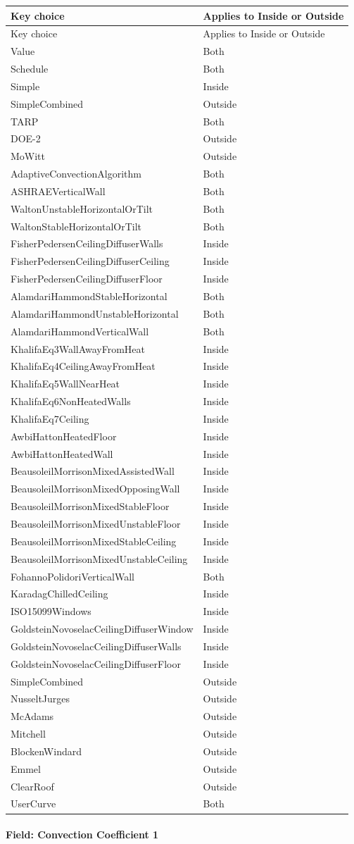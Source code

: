 \begin{longtable}[c]{p{3.49in}p{2.5in}}
\toprule
Key choice & Applies to Inside or Outside \tabularnewline
\midrule
\endfirsthead

\toprule
Key choice & Applies to Inside or Outside \tabularnewline
\midrule
\endhead

Value & Both \tabularnewline
Schedule & Both \tabularnewline
Simple & Inside \tabularnewline
SimpleCombined & Outside \tabularnewline
TARP & Both \tabularnewline
DOE-2 & Outside \tabularnewline
MoWitt & Outside \tabularnewline
AdaptiveConvectionAlgorithm & Both \tabularnewline
ASHRAEVerticalWall~~~ & Both \tabularnewline
WaltonUnstableHorizontalOrTilt & Both \tabularnewline
WaltonStableHorizontalOrTilt & Both \tabularnewline
FisherPedersenCeilingDiffuserWalls & Inside \tabularnewline
FisherPedersenCeilingDiffuserCeiling & Inside \tabularnewline
FisherPedersenCeilingDiffuserFloor & Inside \tabularnewline
AlamdariHammondStableHorizontal & Both \tabularnewline
AlamdariHammondUnstableHorizontal & Both \tabularnewline
AlamdariHammondVerticalWall & Both \tabularnewline
KhalifaEq3WallAwayFromHeat & Inside \tabularnewline
KhalifaEq4CeilingAwayFromHeat & Inside \tabularnewline
KhalifaEq5WallNearHeat & Inside \tabularnewline
KhalifaEq6NonHeatedWalls & Inside \tabularnewline
KhalifaEq7Ceiling & Inside \tabularnewline
AwbiHattonHeatedFloor & Inside \tabularnewline
AwbiHattonHeatedWall & Inside \tabularnewline
BeausoleilMorrisonMixedAssistedWall & Inside \tabularnewline
BeausoleilMorrisonMixedOpposingWall & Inside \tabularnewline
BeausoleilMorrisonMixedStableFloor & Inside \tabularnewline
BeausoleilMorrisonMixedUnstableFloor & Inside \tabularnewline
BeausoleilMorrisonMixedStableCeiling & Inside \tabularnewline
BeausoleilMorrisonMixedUnstableCeiling & Inside \tabularnewline
FohannoPolidoriVerticalWall~~~~~~ & Both \tabularnewline
KaradagChilledCeiling & Inside \tabularnewline
ISO15099Windows & Inside \tabularnewline
GoldsteinNovoselacCeilingDiffuserWindow & Inside \tabularnewline
GoldsteinNovoselacCeilingDiffuserWalls & Inside \tabularnewline
GoldsteinNovoselacCeilingDiffuserFloor & Inside \tabularnewline
SimpleCombined~~~~~ & Outside \tabularnewline
NusseltJurges & Outside \tabularnewline
McAdams & Outside \tabularnewline
Mitchell & Outside \tabularnewline
BlockenWindard & Outside \tabularnewline
Emmel & Outside \tabularnewline
ClearRoof & Outside \tabularnewline
UserCurve & Both \tabularnewline
\bottomrule
\end{longtable}

\paragraph{Field: Convection Coefficient 1}\label{field-convection-coefficient-1}

